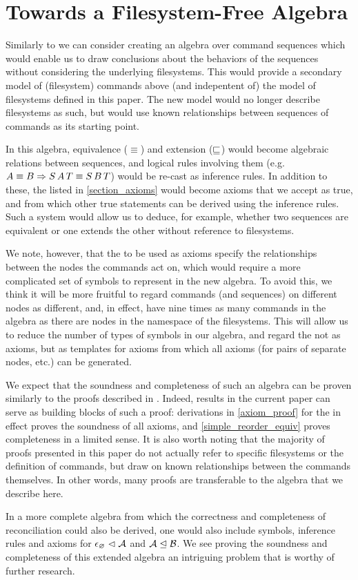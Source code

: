 
\section{Towards a Filesystem-Free Algebra}

Similarly to \cite{NREC} we can consider creating an algebra over command sequences
which would enable us to draw conclusions about the behaviors of the sequences
without considering the underlying filesystems.
This would provide a secondary model of (filesystem) commands above (and indepentent of) the model of filesystems
defined in this paper. The new model would no longer describe filesystems as such,
but would use known relationships between sequences of commands as its starting point.

In this algebra, equivalence ($\equiv$) and extension ($\sqsubseteq$) would become algebraic relations
between sequences, and logical rules involving them
(e.g. $ A\equiv B \Rightarrow S\, A\, T\equiv S\, B\, T $) would be re-cast as inference rules.
In addition to these, the  listed in \cref{section_axioms}
would become axioms that we accept as true, and from which other true statements can be derived
using the inference rules.
Such a system would allow us to deduce, for example, whether two sequences are equivalent
or one extends the other without reference to filesystems.

We note, however, that the  to be used as axioms 
specify the relationships between the nodes
the commands act on, which would require a more complicated set of symbols to represent
in the new algebra.
To avoid this, we think it will be more fruitful to regard commands (and sequences)
on different nodes as different, and, in effect, have nine times as many commands 
in the algebra as there are nodes in the namespace of the filesystems.
This will allow us to reduce the number of types of symbols in our algebra, and regard
the  not as axioms, but as templates for axioms
from which all axioms (for pairs of separate nodes, etc.) can be generated.

We expect that the soundness and completeness of such an algebra can be proven
similarly to the proofs described in \cite{NREC}.
Indeed, results in the current paper can serve as building blocks of such a proof:
derivations in \cref{axiom_proof} for the 
in effect proves the soundness of all axioms,
and \cref{simple_reorder_equiv} proves completeness in a limited sense.
It is also worth noting that the majority of proofs presented in this paper
do not actually refer to specific filesystems or the definition of commands,
but draw on known relationships between the commands themselves.
In other words, many proofs are transferable to the algebra that we describe here.

In a more complete algebra from which the correctness and completeness
of reconciliation could also be derived,
one would also include symbols, inference rules and axioms for 
${\epsilon_\varnothing}\vartriangleleft{\mathcal{A}}$ and ${\mathcal{A}}\trianglelefteq{\mathcal{B}}$.
We see proving the soundness and completeness of this extended algebra
an intriguing problem that is worthy of further research.

